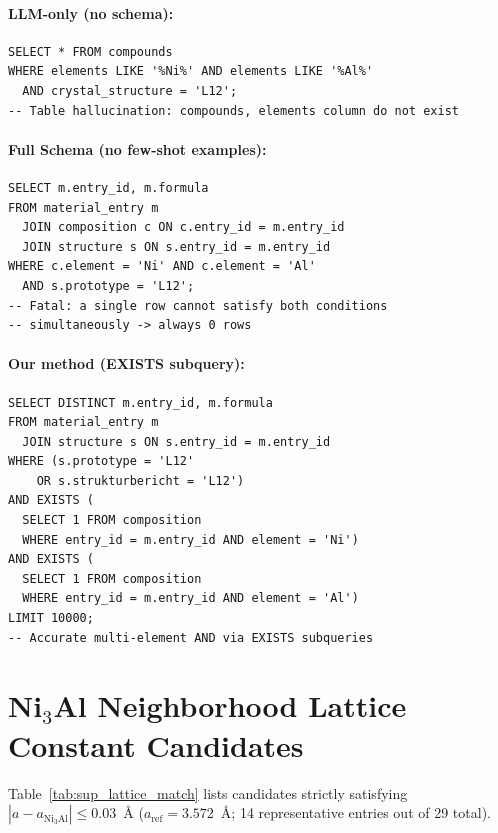 \documentclass{npj-compt.mater}
\begin{document}
\paragraph{LLM-only (no schema):}
\begin{lstlisting}[basicstyle=\ttfamily\scriptsize,breaklines=true]
SELECT * FROM compounds
WHERE elements LIKE '%Ni%' AND elements LIKE '%Al%'
  AND crystal_structure = 'L12';
-- Table hallucination: compounds, elements column do not exist
\end{lstlisting}

\paragraph{Full Schema (no few-shot examples):}
\begin{lstlisting}[basicstyle=\ttfamily\scriptsize,breaklines=true]
SELECT m.entry_id, m.formula
FROM material_entry m
  JOIN composition c ON c.entry_id = m.entry_id
  JOIN structure s ON s.entry_id = m.entry_id
WHERE c.element = 'Ni' AND c.element = 'Al'
  AND s.prototype = 'L12';
-- Fatal: a single row cannot satisfy both conditions
-- simultaneously -> always 0 rows
\end{lstlisting}

\paragraph{Our method (EXISTS subquery):}
\begin{lstlisting}[basicstyle=\ttfamily\scriptsize,breaklines=true]
SELECT DISTINCT m.entry_id, m.formula
FROM material_entry m
  JOIN structure s ON s.entry_id = m.entry_id
WHERE (s.prototype = 'L12'
    OR s.strukturbericht = 'L12')
AND EXISTS (
  SELECT 1 FROM composition
  WHERE entry_id = m.entry_id AND element = 'Ni')
AND EXISTS (
  SELECT 1 FROM composition
  WHERE entry_id = m.entry_id AND element = 'Al')
LIMIT 10000;
-- Accurate multi-element AND via EXISTS subqueries
\end{lstlisting}

\section{Ni$_3$Al Neighborhood Lattice Constant Candidates}
\label{sec:sup_lattice_match}

Table~\ref{tab:sup_lattice_match} lists candidates strictly
satisfying $|a - a_{\text{Ni}_3\text{Al}}| \leq 0.03$~\AA
($a_{\text{ref}} = 3.572$~\AA; 14 representative entries out of
29 total).
\end{document}
